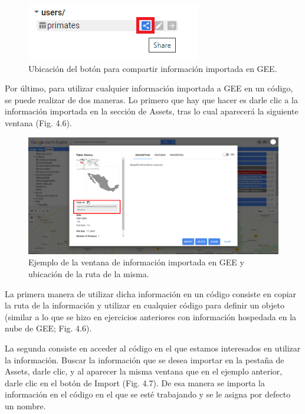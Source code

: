 \documentclass[
  12pt,
  letterpaper,
  twoside]{book}
\begin{document}
\begin{figure}[btp]

{\centering \includegraphics[width=0.3\linewidth]{Img/shareAssets} 

}

\caption{Ubicación del botón para compartir información importada en GEE.}\label{fig:unnamed-chunk-40}
\end{figure}

Por último, para utilizar cualquier información importada a GEE en un código, se puede realizar de dos maneras. Lo primero que hay que hacer es darle clic a la información importada en la sección de Assets, tras lo cual aparecerá la siguiente ventana (Fig. 4.6).

\begin{figure}[btp]

{\centering \includegraphics[width=1\linewidth]{Img/Asset_ruta} 

}

\caption{Ejemplo de la ventana de información importada en GEE y ubicación de la ruta de la misma.}\label{fig:unnamed-chunk-41}
\end{figure}

La primera manera de utilizar dicha información en un código consiste en copiar la ruta de la información y utilizar en cualquier código para definir un objeto (similar a lo que se hizo en ejercicios anteriores con información hospedada en la nube de GEE; Fig. 4.6).

La segunda consiste en acceder al código en el que estamos interesados en utilizar la información. Buscar la información que se desea importar en la pestaña de Assets, darle clic, y al aparecer la misma ventana que en el ejemplo anterior, darle clic en el botón de Import (Fig. 4.7). De esa manera se importa la información en el código en el que se esté trabajando y se le asigna por defecto un nombre.
\end{document}
